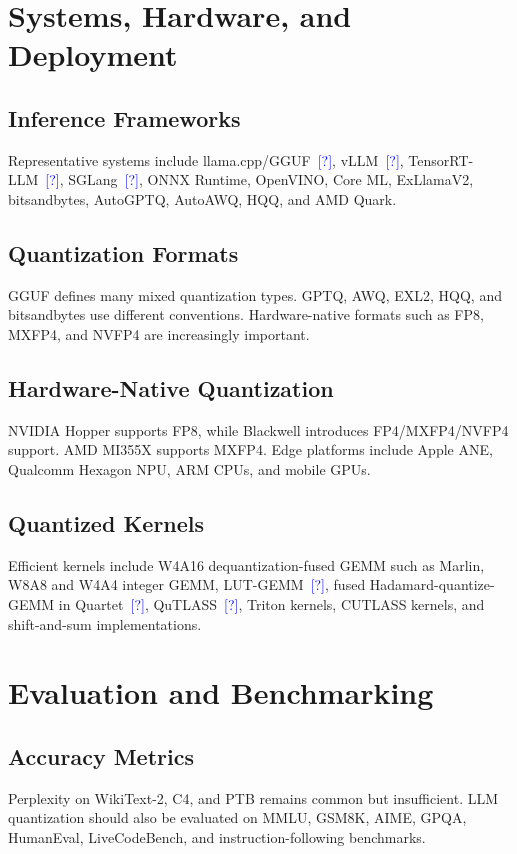 \documentclass[journal,10pt]{IEEEtran}
\newcommand{\CITE}{\textcolor{blue}{[?]}}
\begin{document}
\section{Systems, Hardware, and Deployment}

\subsection{Inference Frameworks}
Representative systems include llama.cpp/GGUF~\CITE, vLLM~\CITE, TensorRT-LLM~\CITE, SGLang~\CITE, ONNX Runtime, OpenVINO, Core ML, ExLlamaV2, bitsandbytes, AutoGPTQ, AutoAWQ, HQQ, and AMD Quark.

\subsection{Quantization Formats}
GGUF defines many mixed quantization types. GPTQ, AWQ, EXL2, HQQ, and bitsandbytes use different conventions. Hardware-native formats such as FP8, MXFP4, and NVFP4 are increasingly important.

\subsection{Hardware-Native Quantization}
NVIDIA Hopper supports FP8, while Blackwell introduces FP4/MXFP4/NVFP4 support. AMD MI355X supports MXFP4. Edge platforms include Apple ANE, Qualcomm Hexagon NPU, ARM CPUs, and mobile GPUs.

\subsection{Quantized Kernels}
Efficient kernels include W4A16 dequantization-fused GEMM such as Marlin, W8A8 and W4A4 integer GEMM, LUT-GEMM~\CITE, fused Hadamard-quantize-GEMM in Quartet~\CITE, QuTLASS~\CITE, Triton kernels, CUTLASS kernels, and shift-and-sum implementations.

\section{Evaluation and Benchmarking}

\subsection{Accuracy Metrics}
Perplexity on WikiText-2, C4, and PTB remains common but insufficient. LLM quantization should also be evaluated on MMLU, GSM8K, AIME, GPQA, HumanEval, LiveCodeBench, and instruction-following benchmarks.
\end{document}

